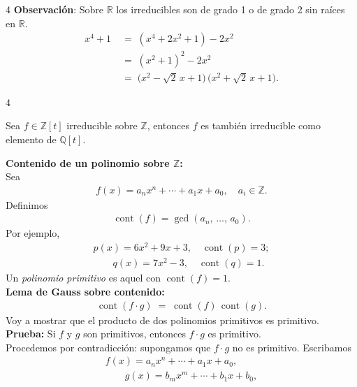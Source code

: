 \documentclass[landscape,a4paper]{article}
\begin{document}
\begin{multicols}{4}
\noindent \textbf{Observación}: Sobre $\mathbb{R}$ los irreducibles son de grado 1 o de grado 2 sin raíces en $\mathbb{R}$.\\
\begin{align*}
  x^4 + 1 \;&=\; (x^4 + 2x^2 + 1) - 2x^2 \;\\ &=\; (x^2 + 1)^2 - 2x^2 \\
\;&=\; \bigl(x^2 - \sqrt{2}\,x + 1\bigr)\,\bigl(x^2 + \sqrt{2}\,x + 1\bigr).
\end{align*}
\end{multicols}
\begin{multicols}{4}
\begin{tcolorbox}[colback=white,colframe=red!80!black,colbacktitle=red!80!black,coltitle=white,title={Teorema: Lema de Gauss (p.~3, col.~1)}]
Sea $f \in \mathbb{Z}[t]$ irreducible sobre $\mathbb{Z}$, entonces $f$ es también irreducible como elemento de $\mathbb{Q}[t]$.
\end{tcolorbox}
\noindent \textbf{Contenido de un polinomio sobre $\mathbb{Z}$:}\\
Sea 
\begin{align*}
f(x) = a_n x^n + \cdots + a_1 x + a_0, \quad a_i \in \mathbb{Z}.
\end{align*}
Definimos
\begin{align*}
  \mathop{\mathrm{cont}}(f) = \gcd(a_n,\,\ldots,\,a_0).
\end{align*}
Por ejemplo, 
\begin{align*}
    p(x) = 6x^2 + 9x + 3, \quad \mathop{\mathrm{cont}}(p) = 3; \\
  \qquad 
  q(x) = 7x^2 - 3, \quad \mathop{\mathrm{cont}}(q) = 1.
\end{align*}
Un \emph{polinomio primitivo} es aquel con $\mathop{\mathrm{cont}}(f) = 1$.\\
\noindent \textbf{Lema de Gauss sobre contenido:}
\begin{align*}
  \mathop{\mathrm{cont}}(f \cdot g) \;=\; \mathop{\mathrm{cont}}(f)\,\mathop{\mathrm{cont}}(g).
\end{align*}
\noindent Voy a mostrar que el producto de dos polinomios primitivos es primitivo. 
\noindent \textbf{Prueba:} Si $f$ y $g$ son primitivos, entonces $f \cdot g$ es primitivo.\\
Procedemos por contradicción: supongamos que $f \cdot g$ no es primitivo. Escribamos
\begin{align*}
    f(x) = a_n x^n + \cdots + a_1 x + a_0, \\
  \qquad
  g(x) = b_m x^m + \cdots + b_1 x + b_0,
\end{align*}


\end{multicols}
\end{document}
